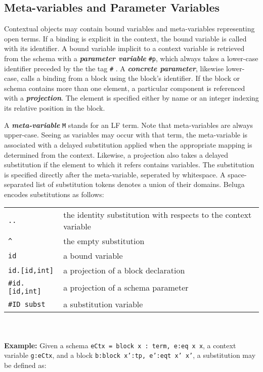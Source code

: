 \documentclass[11pt]{article}
\begin{document}
\subsection{Meta-variables and Parameter Variables}
Contextual objects may contain bound variables and meta-variables representing open terms. If a binding is explicit in the context, the bound variable is called with its identifier. A bound variable implicit to a context variable is retrieved from the schema with a \textit{\textbf{parameter variable}} \texttt{\#p}, which always takes a lower-case identifier preceded by the the tag \texttt{\#} . A \textit{\textbf{concrete parameter}}, likewise lower-case, calls a binding from a block using the block's identifier. If the block or schema contains more than one element, a particular component is referenced with a \textbf{\textit{projection}}. The element is specified either by name or an integer indexing its relative position in the block.

A \textit{\textbf{meta-variable}} \texttt{M} stands for an LF term. Note that meta-variables are always upper-case. Seeing as variables may occur with that term, the meta-variable is associated with a delayed substitution applied when the appropriate mapping is determined from the context. Likewise, a projection also takes a delayed substitution if the element to which it refers contains variables. The substitution is specified directly after the meta-variable, seperated by whitespace. A space-separated list of substitution tokens denotes a union of their domains. Beluga encodes substitutions as follows: \\

\begin{tabular}{ | l l}
\texttt{..} & the identity substitution with respects to the context variable\\
\texttt{\^} & the empty substitution\\
\texttt{id} & a bound variable\\
\texttt{id.[id,int]} & a projection of a block declaration\\
\texttt{\#id.[id,int]} & a projection of a schema parameter\\
\texttt{\#ID subst} & a substitution variable\\
\end{tabular}\\
\\

\textbf{Example:} Given a schema \texttt{eCtx = block x : term, e:eq x x}, a context variable \texttt{g:eCtx}, and a block \texttt{b:block x':tp, e':eqt x' x'}, a substitution may be defined as:
\end{document}
